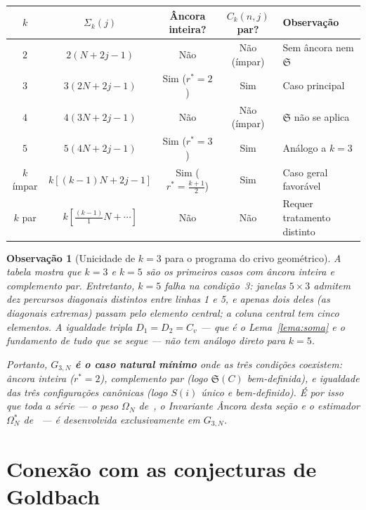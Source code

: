 \documentclass[12pt, a4paper]{article}
\newtheorem{observacao}[lema]{Observação}
\begin{document}
	\begin{center}
		\begin{tabular}{ccccl}
			\hline
			$k$ & $\Sigma_k(j)$ & Âncora inteira? & $C_k(n,j)$ par? & Observação\\
			\hline
			$2$ & $2(N+2j-1)$ & Não & Não (ímpar) & Sem âncora nem $\mathfrak{S}$\\
			$3$ & $3(2N+2j-1)$ & Sim ($r^*=2$) & Sim & Caso principal\\
			$4$ & $4(3N+2j-1)$ & Não & Não (ímpar) & $\mathfrak{S}$ não se aplica\\
			$5$ & $5(4N+2j-1)$ & Sim ($r^*=3$) & Sim & Análogo a $k=3$\\
			$k$ ímpar & $k[(k-1)N+2j-1]$ & Sim ($r^*=\frac{k+1}{2}$) & Sim & Caso geral favorável\\
			$k$ par & $k[\frac{(k-1)}{1}N+\cdots]$ & Não & Não & Requer tratamento distinto\\
			\hline
		\end{tabular}
	\end{center}
	
	\begin{observacao}[Unicidade de $k=3$ para o programa do crivo geométrico]
		A tabela mostra que $k=3$ e $k=5$ são os primeiros casos com âncora inteira
		e complemento par. Entretanto, $k=5$ falha na condição~3: janelas $5\times 3$
		admitem dez percursos diagonais distintos entre linhas 1 e 5, e apenas dois
		deles (as diagonais extremas) passam pelo elemento central; a coluna central
		tem cinco elementos. A igualdade tripla $D_1=D_2=C_v$ --- que é o
		Lema~\ref{lema:soma} e o fundamento de tudo que se segue --- não tem análogo
		direto para $k=5$.
		
		Portanto, \textbf{$G_{3,N}$ é o caso natural mínimo} onde as três condições
		coexistem: âncora inteira ($r^*=2$), complemento par (logo $\mathfrak{S}(C)$
		bem-definida), e igualdade das três configurações canônicas (logo $S(i)$ único
		e bem-definido). É por isso que toda a série --- o peso $\Omega_N$
		de~\cite{bandeira2026}, o Invariante Âncora desta seção e o estimador
		$\Omega^*_N$ de~\cite{bandeira2026c} --- é desenvolvida exclusivamente em
		$G_{3,N}$.
	\end{observacao}
	
	\section{Conexão com as conjecturas de Goldbach}
	\label{sec:goldbach}
	
\end{document}
